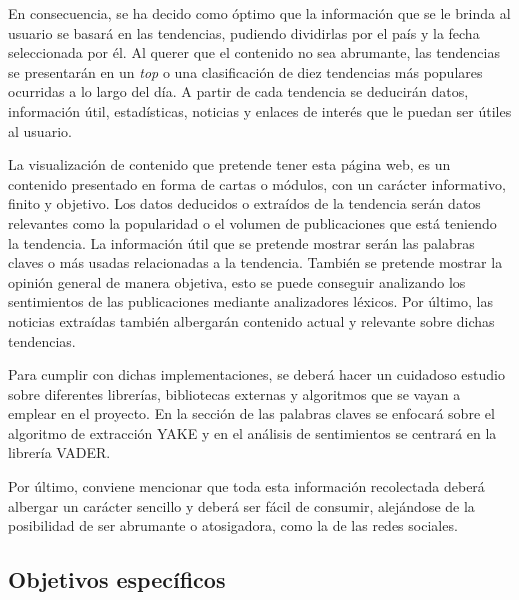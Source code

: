\vspace{0.3cm}

En consecuencia, se ha decido como óptimo que la información que se le brinda al usuario se basará en las tendencias, pudiendo dividirlas por el país y la fecha seleccionada por él. Al querer que el contenido no sea abrumante, las tendencias se presentarán en un \textit{top} o una clasificación de diez tendencias más populares ocurridas a lo largo del día. A partir de cada tendencia se deducirán datos, información útil, estadísticas, noticias y enlaces de interés que le puedan ser útiles al usuario.

\vspace{0.3cm}

La visualización de contenido que pretende tener esta página web, es un contenido presentado en forma de cartas o módulos, con un carácter informativo, finito y objetivo. Los datos deducidos o extraídos de la tendencia serán datos relevantes como la popularidad o el volumen de publicaciones que está teniendo la tendencia. La información útil que se pretende mostrar serán las palabras claves o más usadas relacionadas a la tendencia. También se pretende mostrar la opinión general de manera objetiva, esto se puede conseguir analizando los sentimientos de las publicaciones mediante analizadores léxicos. Por último, las noticias extraídas también albergarán contenido actual y relevante sobre dichas tendencias.

\vspace{0.3cm}

Para cumplir con dichas implementaciones, se deberá hacer un cuidadoso estudio sobre diferentes librerías, bibliotecas externas y algoritmos que se vayan a emplear en el proyecto. En la sección de las palabras claves se enfocará sobre el algoritmo de extracción \ac{YAKE} y en el análisis de sentimientos se centrará en la librería \ac{VADER}.

\vspace{0.3cm}

Por último, conviene mencionar que toda esta información recolectada deberá albergar un carácter sencillo y deberá ser fácil de consumir, alejándose de la posibilidad de ser abrumante o atosigadora, como la de las redes sociales.

\subsection{Objetivos específicos}

